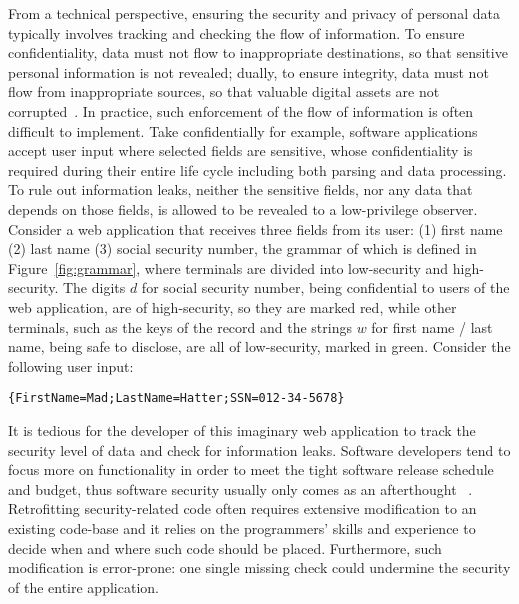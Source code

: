 \documentclass[10pt, letterpaper]{article}
\begin{document}
From a technical perspective, ensuring the security and privacy of personal data
typically involves tracking and checking the flow of information. To ensure
confidentiality, data must not flow to inappropriate destinations, so that
sensitive personal information is not revealed; dually, to ensure integrity,
data must not flow from inappropriate sources, so that valuable digital assets
are not corrupted~\cite{sabelfeld2003language,biba1977integrity}. In practice,
such enforcement of the flow of information is often difficult to implement.
Take confidentially for example, software applications accept user input where
selected fields are sensitive, whose confidentiality is required during their
entire life cycle including both parsing and data processing. To rule out
information leaks, neither the sensitive fields, nor any data that depends on
those fields, is allowed to be revealed to a low-privilege observer. Consider a
web application that receives three fields from its user: (1) first name
(2) last name (3) social security number, the grammar of which
is defined in Figure~\ref{fig:grammar}, where terminals are divided into
low-security and high-security. The digits $d$ for social security number, being
confidential to users of the web application, are of high-security, so they are
marked {\color{red} red}, while other terminals, such as the keys of the record
and the strings $w$ for first name / last name, being safe to disclose, are all
of low-security, marked in {\color{green} green}. Consider the following user
input:

\begin{lstlisting}[numbers=none,xleftmargin=0.15\textwidth,style=tt]
{FirstName=Mad;LastName=Hatter;SSN=012-34-5678}
\end{lstlisting}

\noindent It is tedious for the developer of this imaginary web application to track the
security level of data and check for information leaks. Software developers tend
to focus more on functionality in order to meet the tight software release
schedule and budget, thus software security usually only comes as an
afterthought
~\citep{assal2018security,sharma2017aspects,steward2012software}.
Retrofitting security-related code often requires extensive modification to an
existing code-base and it relies on the programmers' skills and experience to
decide when and where such code should be placed. Furthermore, such modification
is error-prone: one single missing check could undermine the security of the
entire application.
\end{document}
